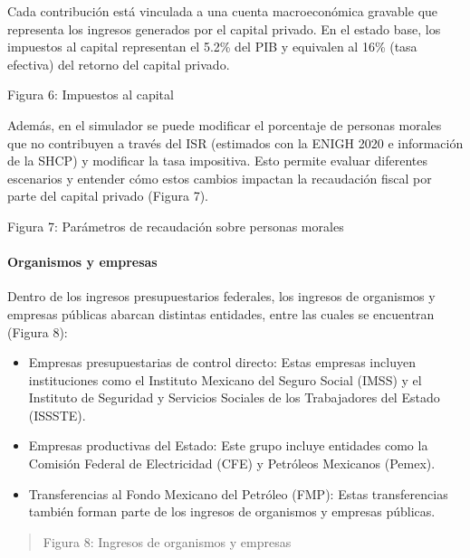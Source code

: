 Cada contribución está vinculada a una cuenta macroeconómica gravable
que representa los ingresos generados por el capital privado. En el
estado base, los impuestos al capital representan el 5.2\% del PIB y
equivalen al 16\% (tasa efectiva) del retorno del capital privado.

Figura 6: Impuestos al capital


Además, en el simulador se puede modificar el porcentaje de personas
morales que no contribuyen a través del ISR (estimados con la ENIGH 2020
e información de la SHCP) y modificar la tasa impositiva. Esto permite
evaluar diferentes escenarios y entender cómo estos cambios impactan la
recaudación fiscal por parte del capital privado (Figura 7).

Figura 7: Parámetros de recaudación sobre personas morales


\hypertarget{organismos-y-empresas}{%
\paragraph{Organismos y empresas}\label{organismos-y-empresas}}

Dentro de los ingresos presupuestarios federales, los ingresos de
organismos y empresas públicas abarcan distintas entidades, entre las
cuales se encuentran (Figura 8):

\begin{itemize}
\item
  Empresas presupuestarias de control directo: Estas empresas incluyen
  instituciones como el Instituto Mexicano del Seguro Social (IMSS) y el
  Instituto de Seguridad y Servicios Sociales de los Trabajadores del
  Estado (ISSSTE).
\item
  Empresas productivas del Estado: Este grupo incluye entidades como la
  Comisión Federal de Electricidad (CFE) y Petróleos Mexicanos (Pemex).
\item
  Transferencias al Fondo Mexicano del Petróleo (FMP): Estas
  transferencias también forman parte de los ingresos de organismos y
  empresas públicas.
\end{itemize}

\begin{quote}
Figura 8: Ingresos de organismos y empresas
\end{quote}

